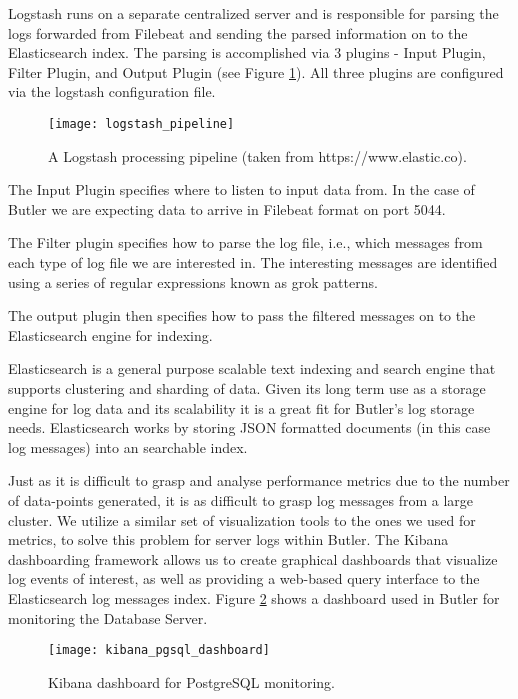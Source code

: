 Logstash runs on a separate centralized server and is responsible for parsing the logs forwarded from Filebeat and sending the parsed information on to the Elasticsearch index. The parsing is accomplished via 3 plugins - Input Plugin, Filter Plugin, and Output Plugin (see Figure \ref{fig:logstash_pipeline}). All three plugins are configured via the logstash configuration file.

\begin{figure}[h]
\texttt{[image: logstash\_pipeline]}
\centering
\caption {A Logstash processing pipeline (taken from https://www.elastic.co).}
\label{fig:logstash_pipeline}
\end{figure}

The Input Plugin specifies where to listen to input data from. In the case of Butler we are expecting data to arrive in Filebeat format on port 5044.

The Filter plugin specifies how to parse the log file, i.e., which messages from each type of log file we are interested in. The interesting messages are identified using a series of regular expressions known as grok patterns. 

The output plugin then specifies how to pass the filtered messages on to the Elasticsearch engine for indexing.

Elasticsearch is a general purpose scalable text indexing and search engine that supports clustering and sharding of data. Given its long term use as a storage engine for log data and its scalability it is a great fit for Butler's log storage needs. Elasticsearch works by storing JSON formatted documents (in this case log messages) into an searchable index. 

Just as it is difficult to grasp and analyse performance metrics due to the number of data-points generated, it is as difficult to grasp log messages from a large cluster. We utilize a similar set of visualization tools to the ones we used for metrics, to solve this problem for server logs within Butler. The Kibana dashboarding framework allows us to create graphical dashboards that visualize log events of interest, as well as providing a web-based query interface to the Elasticsearch log messages index. Figure \ref{fig:kibana_pgsql_dashboard} shows a dashboard used in Butler for monitoring the Database Server.

\begin{figure}[h]
\texttt{[image: kibana\_pgsql\_dashboard]}
\centering
\caption {Kibana dashboard for PostgreSQL monitoring.}
\label{fig:kibana_pgsql_dashboard}
\end{figure}
 
